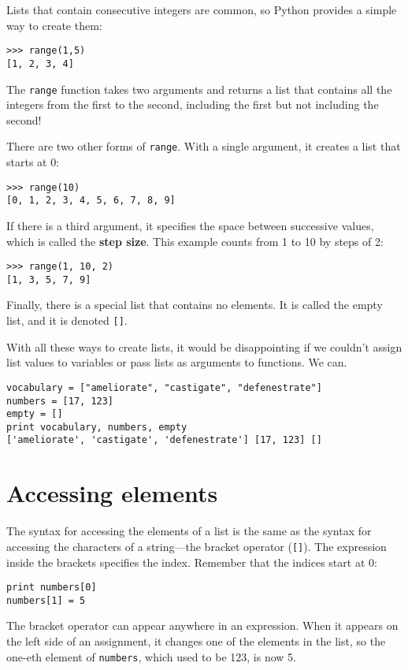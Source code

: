 
Lists that contain consecutive integers are common, so Python provides a
simple way to create them:

\beforeverb
\begin{verbatim}
>>> range(1,5)
[1, 2, 3, 4]
\end{verbatim}
\afterverb
%
The {\tt range} function takes two arguments and returns a list that
contains all the integers from the first to the second, including the
first but not including the second!

There are two other forms of {\tt range}.  With a single argument, it
creates a list that starts at 0:

\beforeverb
\begin{verbatim}
>>> range(10)
[0, 1, 2, 3, 4, 5, 6, 7, 8, 9]
\end{verbatim}
\afterverb
%
If there is a third argument, it specifies the space between
successive values, which is called the {\bf step size}.  This example
counts from 1 to 10 by steps of 2:

\beforeverb
\begin{verbatim}
>>> range(1, 10, 2)
[1, 3, 5, 7, 9]
\end{verbatim}
\afterverb
%
Finally, there is a special list that contains no elements.  It is
called the empty list, and it is denoted {\tt []}.

With all these ways to create lists, it would be disappointing if we
couldn't assign list values to variables or pass lists as arguments
to functions.  We can.

\beforeverb
\begin{verbatim}
vocabulary = ["ameliorate", "castigate", "defenestrate"]
numbers = [17, 123]
empty = []
print vocabulary, numbers, empty
['ameliorate', 'castigate', 'defenestrate'] [17, 123] []
\end{verbatim}
\afterverb
%


\section{Accessing elements}

The syntax for accessing the elements of a list is the same as the
syntax for accessing the characters of a string---the bracket
operator ({\tt []}).  The expression inside the brackets
specifies the index.  Remember that the indices start at 0:

\beforeverb
\begin{verbatim}
print numbers[0]
numbers[1] = 5
\end{verbatim}
\afterverb
%
The bracket operator can appear anywhere in an expression.  When it
appears on the left side of an assignment, it changes one of the
elements in the list, so the one-eth element of {\tt numbers}, which
used to be 123, is now 5.

